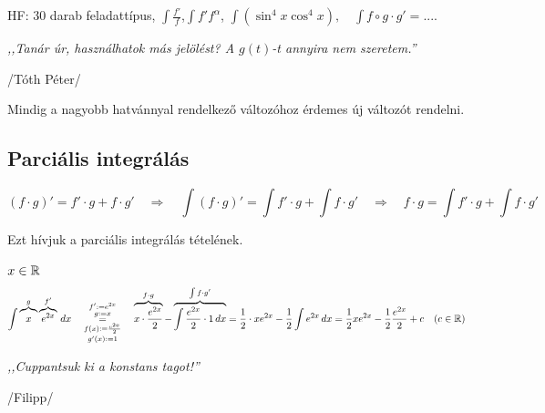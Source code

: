 \documentclass[a4paper,11.5pt]{article}
\begin{document}
	HF: 30 darab feladattípus, $\int\frac{f'}{f}$,\quad  $\int f'f^\alpha$, \quad $\int(\sin^4x\cos^4x),\quad \int f\circ g\cdot g'=...$.
	\begin{center}
		\bigskip
		
		\textit{,,Tanár úr, használhatok más jelölést? A $g(t)$-t annyira nem szeretem.''}
		\smallskip
		
		/Tóth Péter/
		\bigskip
		
	\end{center}
	\begin{note}
		Mindig a nagyobb hatvánnyal rendelkező változóhoz érdemes új változót rendelni.
	\end{note}
	\subsection{Parciális integrálás}
	\begin{revision}
		\[ (f\cdot g)'=f'\cdot g + f\cdot g'\quad \Rightarrow\quad \int(f\cdot g)'=\int f'\cdot g + \int f\cdot g'\quad \Rightarrow\quad f\cdot g=\int f'\cdot g + \int f\cdot g'\]
		\begin{center}	
		\end{center}
		Ezt hívjuk a parciális integrálás tételének.
	\end{revision}
	\begin{task}$x\in\mathbb{R}$
		\[ \int \overbrace{x\vphantom{e^2}}^{g}\overbrace{e^{2x}}^{f'}\,dx\quad \underset{g'(x):=1}{\overset{f':=e^{2x}}{\overset{g:=x}{\underset{f(x):=\frac{e^{2x}}{2}}{=}}}}
		\quad \overbrace{x\cdot\frac{e^{2x}}{2}}^{f\cdot g}-\overbrace{\int\frac{e^{2x}}{2}\cdot1\,dx}^{\int f\cdot g'}=\frac{1}{2}\cdot xe^{2x}-\frac{1}{2}\int e^{2x}\,dx=\frac{1}{2}xe^{2x}-\frac{1}{2}\frac{e^{2x}}{2}+c\quad (c\in\mathbb{R}) \]
	\end{task}
	
	\begin{center}
		\textit{,,Cuppantsuk ki a konstans tagot!''}
		\smallskip
		
		/Filipp/
	\end{center}
	
\end{document}

